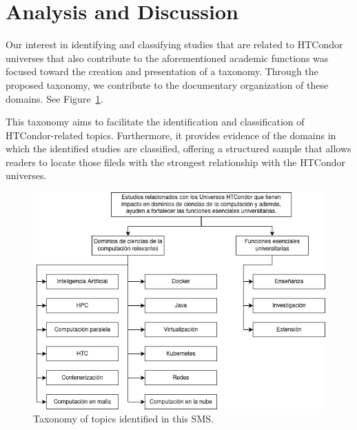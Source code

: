\section{Analysis and Discussion}\label{sec:analisis-discusion}

Our interest in identifying and classifying studies that are related to HTCondor universes that also contribute to the aforementioned academic functions was focused toward the creation and presentation of a taxonomy. Through the proposed taxonomy, we contribute to the documentary organization of these domains. See Figure~\ref{fig:taxonomia}.

This taxonomy aims to facilitate the identification and classification of HTCondor-related topics. Furthermore, it provides evidence of the domains in which the identified studies are classified, offering a structured sample that allows readers to locate those fileds with the strongest relationship with the HTCondor universes.


\begin{figure}[htbp]
	\centering
	\vspace{10pt}
	\includegraphics[scale=0.4]{resources/figures/sms-taxonomia.drawio.png}
	\vspace{6pt}
	\caption{Taxonomy of topics identified in this SMS.}
	\label{fig:taxonomia}
\end{figure}
